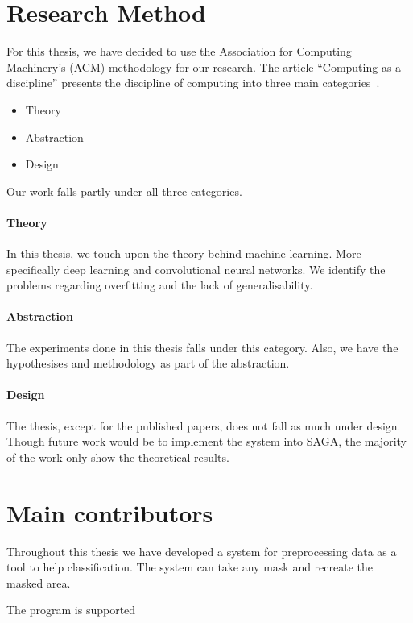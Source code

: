 \section{Research Method}
For this thesis, we have decided to use the Association for Computing Machinery's (ACM) methodology for our research. The article ``Computing as a discipline'' presents the discipline of computing into three main categories~\cite{Denning:1989:CD:63238.63239}. 
\begin{itemize}
\item Theory
\item Abstraction
\item Design
\end{itemize}
Our work falls partly under all three categories.

\paragraph{Theory}
In this thesis, we touch upon the theory behind machine learning. More specifically deep learning and convolutional neural networks. We identify the problems regarding overfitting and the lack of generalisability.

\paragraph{Abstraction}
The experiments done in this thesis falls under this category. Also, we have the hypothesises and methodology as part of the abstraction.

\paragraph{Design}
The thesis, except for the published papers, does not fall as much under design. Though future work would be to implement the system into SAGA, the majority of the work only show the theoretical results. 





\section{Main contributors}
Throughout this thesis we have developed a system for preprocessing data as a tool to help classification. 
The system can take any mask and recreate the masked area.



The program is supported

